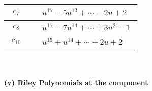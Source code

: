 \documentclass[1p]{elsarticle_modified}
\theoremstyle{definition}
\begin{document}
\begin{tabular}{m{50pt}|m{274pt}}
\hline $$\begin{aligned}c_{7}\end{aligned}$$&$\begin{aligned}
&u^{15}-5 u^{13}+\cdots-2 u+2
\end{aligned}$\\
\hline $$\begin{aligned}c_{8}\end{aligned}$$&$\begin{aligned}
&u^{15}-7 u^{14}+\cdots+3 u^2-1
\end{aligned}$\\
\hline $$\begin{aligned}c_{10}\end{aligned}$$&$\begin{aligned}
&u^{15}+u^{14}+\cdots+2 u+2
\end{aligned}$\\
\hline
\end{tabular}\\~\\
\newpage\renewcommand{\arraystretch}{1}
\flushleft \textbf{(v) Riley Polynomials at the component}\newline \\
\end{document}
